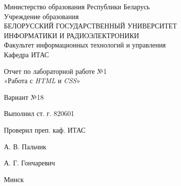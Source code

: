 \begin{titlepage}
\thispagestyle{empty}
\setlength{\parindent}{0ex} %

\begin{center}
  Министерство образования Республики Беларусь \\
  \vspace{0.5ex}
  Учреждение образования \\
  БЕЛОРУССКИЙ ГОСУДАРСТВЕННЫЙ УНИВЕРСИТЕТ \\
  ИНФОРМАТИКИ И РАДИОЭЛЕКТРОНИКИ \\
  \vspace{0.5ex}
  Факультет информационных технологий и управления \\
  \vspace{0.5ex}
  Кафедра ИТАС
\end{center}

\vspace{50mm}

\begin{center}
    Отчет по лабораторной работе №1 \\
    «Работа с \textit{HTML} и \textit{CSS}»

      \smallskip
      Вариант №18
\end{center}

\vspace{50mm}

\begin{minipage}{.4\linewidth}
    Выполнил ст. г. 820601

    \smallskip

    Проверил преп. каф. ИТАС
\end{minipage}
\hfill
\begin{minipage}{.4\linewidth}
    \begin{flushright}
        А. В. Пальчик

        \smallskip

         А. Г. Гончаревич
    \end{flushright}
\end{minipage}

\vfill
\begin{center}
  Минск \the\year{}
\end{center}

\setlength{\parindent}{1.25cm} %
\end{titlepage}
